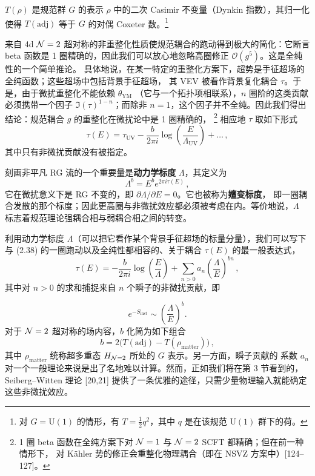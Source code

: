
$T(\rho)$ 是规范群 $G$ 的表示 $\rho$ 中的二次 Casimir 不变量（Dynkin 指数），其归一化使得
$T(\mathrm{adj})$ 等于 $G$ 的对偶 Coxeter 数。\footnote{对 $G=\mathrm{U}(1)$ 的情形，有
$T=\frac{1}{2}q^2$，其中 $q$ 是在该规范 $\mathrm{U}(1)$ 群下的荷。}

来自 4d $\mathcal{N}=2$ 超对称的非重整化性质使规范耦合的跑动得到极大的简化：它断言 beta 函数是
1 圈精确的，因此我们可以放心地忽略高圈修正 $\mathcal O(g^5)$。这是全纯性的一个简单推论。
具体地说，在某一特定的重整化方案下，超势是手征超场的全纯函数；这些超场中包括背景手征超场，
其 VEV 被看作背景复化耦合 $\tau$。于是，由于微扰重整化不能依赖 $\theta_{\mathrm{YM}}$
（它与一个拓扑项相联系），$n$ 圈阶的这类贡献必须携带一个因子 $\Im(\tau)^{1-n}$；而除非
$n=1$，这个因子并不全纯。因此我们得出结论：规范耦合 $g$ 的重整化在微扰论中是 1 圈精确的，
\footnote{1 圈 beta 函数在全纯方案下对 $\mathcal{N}=1$ 与 $\mathcal{N}=2$ SCFT 都精确；但在前一种情形下，
对 Kähler 势的修正会重整化物理耦合（即在 NSVZ 方案中）[124--127]。}
相应地 $\tau$ 取如下形式
\begin{equation}
  \tau(E)=\tau_{\mathrm{UV}}-\frac{b}{2\pi i}\log\left(\frac{E}{\Lambda_{\mathrm{UV}}}\right)+\dots\,,
  \tag{2.38}
\end{equation}
其中只有非微扰贡献没有被指定。

刻画非平凡 RG 流的一个重要量是\textbf{动力学标度} $\Lambda$，其定义为
\begin{equation}
  \Lambda^b=E^b e^{2\pi i\tau(E)}\,,
  \tag{2.39}
\end{equation}
它在微扰意义下是 RG 不变的，即 $\partial\Lambda/\partial E=0$。它也被称为\textbf{嬗变标度}，
即一圈耦合发散的那个标度；因此更高圈与非微扰效应都必须被考虑在内。等价地说，$\Lambda$
标志着规范理论强耦合相与弱耦合相之间的转变。

利用动力学标度 $\Lambda$（可以把它看作某个背景手征超场的标量分量），我们可以写下与 (2.38)
的一圈跑动以及全纯性都相容的、关于耦合 $\tau(E)$ 的最一般表达式，
\begin{equation}
  \tau(E)=-\frac{b}{2\pi i}\log\left(\frac{E}{\Lambda}\right)+\sum_{n>0}a_n\left(\frac{\Lambda}{E}\right)^{bn}\,,
  \tag{2.40}
\end{equation}
其中对 $n>0$ 的求和捕捉来自 $n$ 个瞬子的非微扰贡献，即

\[
  e^{-S_{\mathrm{inst}}}\sim\left(\frac{\Lambda}{E}\right)^{b}.
\]
对于 $\mathcal{N}=2$ 超对称的场内容，$b$ 化简为如下组合
\begin{equation}
  b=2\big(T(\mathrm{adj})-T(\rho_{\text{matter}})\big)\,,
  \tag{2.41}
\end{equation}
其中 $\rho_{\text{matter}}$ 统称超多重态 $H_{\mathcal{N}=2}$ 所处的 $G$ 表示。另一方面，瞬子贡献的
系数 $a_n$ 对一个一般理论来说是出了名地难以计算。然而，正如我们将在第 3 节看到的，
Seiberg--Witten 理论 [20,21] 提供了一条优雅的途径，只需少量物理输入就能确定这些非微扰效应。

